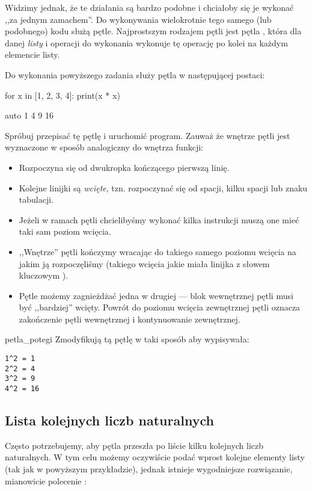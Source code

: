 \documentclass{pdfBooklets}
\begin{document}
Widzimy jednak, że te działania są bardzo podobne i chciałoby się je wykonać ,,za jednym zamachem''.
Do wykonywania wielokrotnie tego samego (lub podobnego) kodu służą pętle.
Najprostszym rodzajem pętli jest pętla , która dla danej \emph{listy} i operacji do wykonania
wykonuje tę operację po kolei na każdym elemencie listy.

Do wykonania powyższego zadania służy pętla  w następującej postaci:

\begin{CodeFrame}[python]{.5\textwidth}
for x in [1, 2, 3, 4]:
    print(x * x)
\end{CodeFrame}
\begin{CodeFrame}{auto}
1
4
9
16
\end{CodeFrame}

\noindent Spróbuj przepisać tę pętlę i uruchomić program.
Zauważ że wnętrze pętli jest wyznaczone w sposób analogiczny do wnętrza funkcji:
\begin{itemize}
	\item Rozpoczyna się od dwukropka kończącego pierwszą linię.
	\item Kolejne linijki są \emph{wcięte}, tzn. rozpoczynać się od spacji, kilku spacji lub znaku tabulacji.
	\item Jeżeli w ramach pętli chcielibyśmy wykonać kilka instrukcji muszą one mieć taki sam poziom wcięcia.
	\item ,,Wnętrze'' pętli kończymy wracając do takiego samego poziomu wcięcia na jakim ją rozpoczęliśmy
	      (takiego wcięcia jakie miała linijka z słowem kluczowym ).
	\item Pętle możemy zagnieżdżać jedna w drugiej --- blok wewnętrznej pętli musi być ,,bardziej'' wcięty.
	Powrót do poziomu wcięcia zewnętrznej pętli oznacza zakończenie pętli wewnętrznej i kontynuowanie zewnętrznej.
\end{itemize}

\begin{Zadanie}{}{petla_potegi}
Zmodyfikują tą pętlę w taki sposób aby wypisywała:
\begin{Verbatim}
1^2 = 1
2^2 = 4
3^2 = 9
4^2 = 16
\end{Verbatim}
\end{Zadanie}

\subsection{Lista kolejnych liczb naturalnych}
Często potrzebujemy, aby pętla przeszła po liście kilku kolejnych liczb naturalnych.
W tym celu możemy oczywiście podać wprost kolejne elementy listy (tak jak w powyższym przykładzie),
jednak istnieje wygodniejsze rozwiązanie, mianowicie polecenie :
\end{document}
